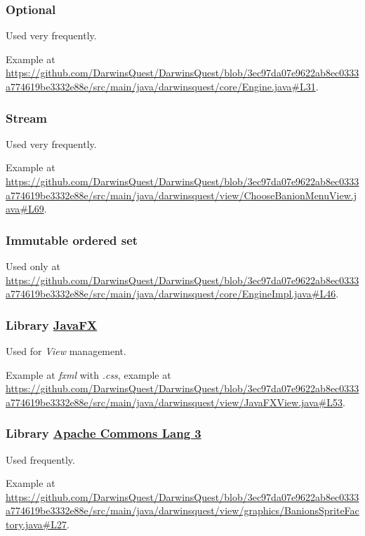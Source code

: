 \documentclass[12pt, a4paper]{report}
\theoremstyle{definition}
\begin{document}
        \subsubsection{Optional}

        Used very frequently.

        Example at \url{https://github.com/DarwinsQuest/DarwinsQuest/blob/3ec97da07e9622ab8ec0333a774619be3332e88e/src/main/java/darwinsquest/core/Engine.java#L31}.

        \subsubsection{Stream}

        Used very frequently.

        Example at \url{https://github.com/DarwinsQuest/DarwinsQuest/blob/3ec97da07e9622ab8ec0333a774619be3332e88e/src/main/java/darwinsquest/view/ChooseBanionMenuView.java#L69}.

        \subsubsection{Immutable ordered set}

        Used only at \url{https://github.com/DarwinsQuest/DarwinsQuest/blob/3ec97da07e9622ab8ec0333a774619be3332e88e/src/main/java/darwinsquest/core/EngineImpl.java#L46}.

        \subsubsection{Library \href{https://openjfx.io/}{JavaFX}}
        
        Used for \emph{View} management.

        Example at \textit{fxml} with \textit{.css}, example at \url{https://github.com/DarwinsQuest/DarwinsQuest/blob/3ec97da07e9622ab8ec0333a774619be3332e88e/src/main/java/darwinsquest/view/JavaFXView.java#L53}.
        
        \subsubsection{Library \href{https://commons.apache.org/proper/commons-lang/}{Apache Commons Lang 3}}
        
        Used frequently.

        Example at \url{https://github.com/DarwinsQuest/DarwinsQuest/blob/3ec97da07e9622ab8ec0333a774619be3332e88e/src/main/java/darwinsquest/view/graphics/BanionsSpriteFactory.java#L27}.
        
\end{document}
